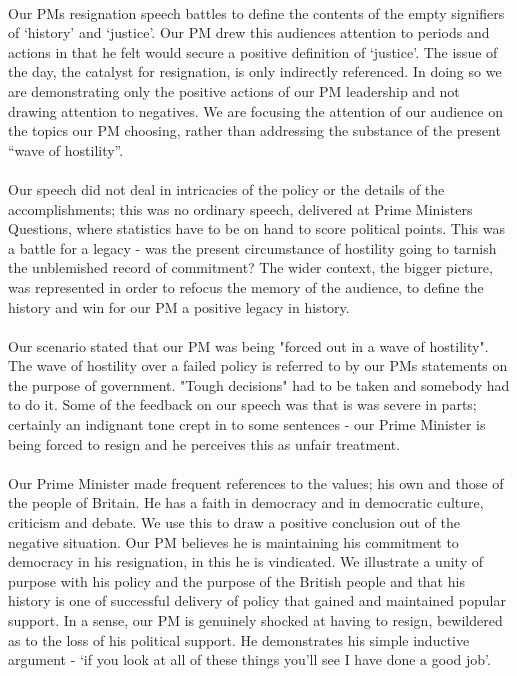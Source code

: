 \documentclass[12pt]{article}
\begin{document}
\begin{doublespace}
\paragraph{}Our PMs resignation speech battles to define the contents of the empty signifiers of `history' and `justice'. Our PM drew this audiences attention to periods and actions in that he felt would secure a positive definition of  `justice'. The issue of the day, the catalyst for resignation, is only indirectly referenced. In doing so we are demonstrating only the positive actions of our PM leadership and not drawing attention to negatives. We are focusing the attention of our audience on the topics our PM choosing, rather than addressing the substance of the present ``wave of hostility''.

\paragraph{}Our speech did not deal in intricacies of the policy or the details of the accomplishments; this was no ordinary speech, delivered at Prime Ministers Questions, where statistics have to be on hand to score political points. This was a battle for a legacy - was the present circumstance of hostility going to tarnish the unblemished record of commitment? The wider context, the bigger picture, was represented in order to refocus the memory of the audience, to define the history and win for our PM a positive legacy in history.

\paragraph{}Our scenario stated that our PM was being "forced out in a wave of hostility". The wave of hostility over a failed policy is referred to by our PMs statements on the purpose of government. "Tough decisions" had to be taken and somebody had to do it. Some of the feedback on our speech was that is was severe in parts; certainly an indignant tone crept in to some sentences - our Prime Minister is being forced to resign and he perceives this as unfair treatment.

\paragraph{}Our Prime Minister made frequent references to the values; his own and those of the people of Britain. He has a faith in democracy and in democratic culture, criticism and debate. We use this to draw a positive conclusion out of the negative situation. Our PM believes he is maintaining his commitment to democracy in his resignation, in this he is vindicated. We illustrate a unity of purpose with his policy and the purpose of the British people and that his history is one of successful delivery of policy that gained and maintained popular support. In a sense, our PM is genuinely shocked at having to resign, bewildered as to the loss of his political support. He demonstrates his simple inductive argument - `if you look at all of these things you'll see I have done a good job'.


\end{doublespace}
\end{document}
